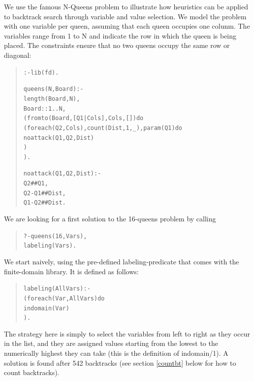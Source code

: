 We use the famous N-Queens problem to illustrate how heuristics can be applied
to backtrack search through variable and value selection.
We model the problem with one variable per queen, assuming that each queen
occupies one colunm. The variables range from 1 to N and indicate the row
in which the queen is being placed. The constraints ensure that no two
queens occupy the same row or diagonal:
\begin{quote}\begin{alltt}
:- lib(fd).

queens(N, Board) :-
        length(Board, N),
        Board :: 1..N,
        ( fromto(Board, [Q1|Cols], Cols, []) do
            ( foreach(Q2, Cols), count(Dist,1,_), param(Q1) do
                noattack(Q1, Q2, Dist)
            )
        ).

    noattack(Q1,Q2,Dist) :-
        Q2 ## Q1,
        Q2 - Q1 ## Dist,
        Q1 - Q2 ## Dist.
\end{alltt}\end{quote}
We are looking for a first solution to the 16-queens problem by calling
\begin{quote}\begin{alltt}
?- queens(16, Vars),   %
   labeling(Vars).     %
\end{alltt}\end{quote}
We start naively, using the pre-defined labeling-predicate that comes with the
finite-domain library. It is defined as follows:
\begin{quote}\begin{alltt}
labeling(AllVars) :-
        ( foreach(Var, AllVars) do
            indomain(Var)                       %
        ).
\end{alltt}\end{quote}
The strategy here is simply to select the variables
from left to right as they occur in the list, and they are
assigned values starting from the lowest to the numerically highest they can
take (this is the definition of indomain/1).
A solution is found after 542 backtracks
(see section \ref{countbt} below for how to count backtracks).

